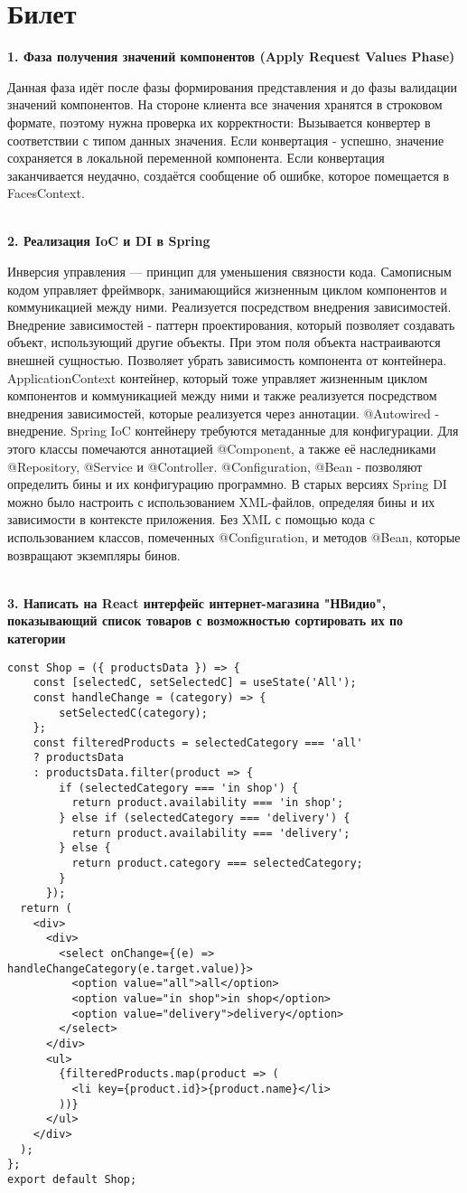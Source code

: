 \documentclass{article}
\newcommand{\bil}[5]{%
        \section{Билет}
        \textbf{1. #1}

        #4
        \\
        \textbf{2. #2}
        
        #5
        \\
        \textbf{3. #3}
}
\begin{document}
\bil{Фаза получения значений компонентов (Apply Request Values Phase)}
{Реализация IoC и DI в Spring}
{Написать на React интерфейс интернет-магазина "НВидио", показывающий список товаров с возможностью сортировать их по категории}{
    Данная фаза идёт после фазы формирования представления и до фазы валидации значений компонентов. 
    На стороне клиента все значения хранятся в строковом формате, поэтому нужна проверка их корректности: Вызывается конвертер в соответствии с типом данных значения. 
    Если конвертация - успешно, значение сохраняется в локальной переменной компонента. 
    Если конвертация заканчивается неудачно, создаётся сообщение об ошибке, которое помещается в FacesContext.
}{
    Инверсия управления — принцип для уменьшения связности кода. 
    Самописным кодом управляет фреймворк, занимающийся жизненным циклом компонентов и коммуникацией между ними. 
    Реализуется посредством внедрения зависимостей. Внедрение зависимостей - паттерн проектирования, который позволяет создавать объект, использующий другие объекты. 
    При этом поля объекта настраиваются внешней сущностью. 
    Позволяет убрать зависимость компонента от контейнера. 
    ApplicationContext контейнер, который тоже управляет жизненным циклом компонентов и коммуникацией между ними и также реализуется посредством внедрения зависимостей, которые реализуется через аннотации. 
    @Autowired - внедрение. Spring IoC контейнеру требуются метаданные для конфигурации. Для этого классы помечаются аннотацией @Component, а также её наследниками @Repository, @Service и @Controller. @Configuration, @Bean - позволяют определить бины и их конфигурацию программно. 
    В старых версиях Spring DI можно было настроить с использованием XML-файлов, определяя бины и их зависимости в контексте приложения. Без XML с помощью кода с использованием классов, помеченных @Configuration, и методов @Bean, которые возвращают экземпляры бинов.
}
\begin{lstlisting}[frame=single, basicstyle=\ttfamily, breaklines=true, breakatwhitespace=true, postbreak=\mbox{\textcolor{red}{$\hookrightarrow$}\space}]
const Shop = ({ productsData }) => {
    const [selectedC, setSelectedC] = useState('All');
    const handleChange = (category) => {
        setSelectedC(category);
    };
    const filteredProducts = selectedCategory === 'all'
    ? productsData
    : productsData.filter(product => {
        if (selectedCategory === 'in shop') {
          return product.availability === 'in shop';
        } else if (selectedCategory === 'delivery') {
          return product.availability === 'delivery';
        } else {
          return product.category === selectedCategory;
        }
      });
  return (
    <div>
      <div>
        <select onChange={(e) => handleChangeCategory(e.target.value)}>
          <option value="all">all</option>
          <option value="in shop">in shop</option>
          <option value="delivery">delivery</option>
        </select>
      </div>
      <ul>
        {filteredProducts.map(product => (
          <li key={product.id}>{product.name}</li>
        ))}
      </ul>
    </div>
  );
};
export default Shop;
\end{lstlisting}
\end{document}
